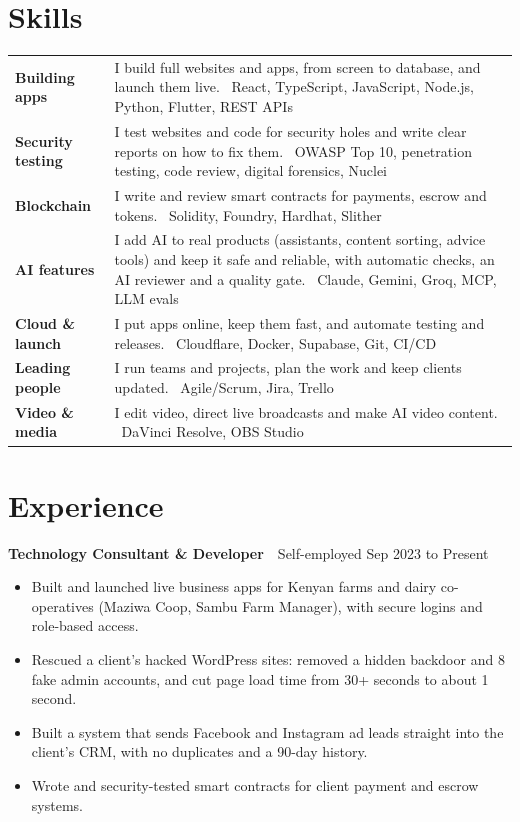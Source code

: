 \documentclass[10pt,a4paper]{article}
\newcommand{\displayfont}{\fontfamily{SourceSerifPro-LF}\selectfont}
\newcommand{\role}[3]{%
  \par\needspace{3\baselineskip}\vspace{0.25em}%
  {\displayfont\bfseries #1}\ {\color{printmuted}\textbar\ #2}%
  \hfill{\small\color{printmuted}#3}\par\vspace{0.1em}%
}
\newcommand{\skillrow}[3]{%
  \textcolor{accent}{\textbf{#1}} & #2 {\color{printmuted}\textbar\ #3} \\[0.25em]
}
\begin{document}
\section{Skills}
\small
\renewcommand{\arraystretch}{1.1}
\begin{tabular}{@{}>{\RaggedRight}p{2.9cm} >{\RaggedRight\arraybackslash}p{14.3cm}@{}}
\skillrow{Building apps}{I build full websites and apps, from screen to database, and launch them live.}{React, TypeScript, JavaScript, Node.js, Python, Flutter, REST APIs}
\skillrow{Security testing}{I test websites and code for security holes and write clear reports on how to fix them.}{OWASP Top 10, penetration testing, code review, digital forensics, Nuclei}
\skillrow{Blockchain}{I write and review smart contracts for payments, escrow and tokens.}{Solidity, Foundry, Hardhat, Slither}
\skillrow{AI features}{I add AI to real products (assistants, content sorting, advice tools) and keep it safe and reliable, with automatic checks, an AI reviewer and a quality gate.}{Claude, Gemini, Groq, MCP, LLM evals}
\skillrow{Cloud \& launch}{I put apps online, keep them fast, and automate testing and releases.}{Cloudflare, Docker, Supabase, Git, CI/CD}
\skillrow{Leading people}{I run teams and projects, plan the work and keep clients updated.}{Agile/Scrum, Jira, Trello}
\skillrow{Video \& media}{I edit video, direct live broadcasts and make AI video content.}{DaVinci Resolve, OBS Studio}
\end{tabular}
\normalsize

\section{Experience}

\role{Technology Consultant \& Developer}{Self-employed}{Sep 2023 to Present}
\begin{itemize}
  \item Built and launched live business apps for Kenyan farms and dairy co-operatives (Maziwa Coop, Sambu Farm Manager), with secure logins and role-based access.
  \item Rescued a client's hacked WordPress sites: removed a hidden backdoor and 8 fake admin accounts, and cut page load time from 30+ seconds to about 1 second.
  \item Built a system that sends Facebook and Instagram ad leads straight into the client's CRM, with no duplicates and a 90-day history.
  \item Wrote and security-tested smart contracts for client payment and escrow systems.
\end{itemize}
\end{document}
